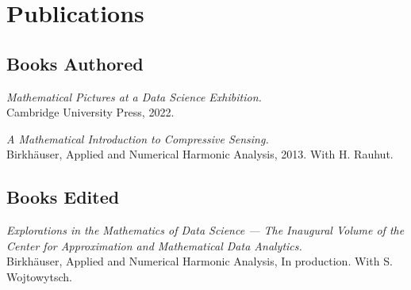 \documentclass[11pt]{article}
\begin{document}
%


\section{Publications}

\subsection{Books Authored}
\betaremune
\item{\sl Mathematical Pictures at a Data Science Exhibition.}\\
Cambridge University Press, 2022. 
\item {\sl A Mathematical Introduction to Compressive Sensing.}\\
Birkh\"auser, Applied and Numerical Harmonic Analysis, 2013.  With H. Rauhut.
\eetaremune

\subsection{Books Edited}
\betaremune
\item{\sl Explorations in the Mathematics of Data Science --- The Inaugural Volume of the Center for Approximation and Mathematical Data Analytics.}\\
Birkh\"auser, Applied and Numerical Harmonic Analysis, In production. With S. Wojtowytsch.
\eetaremune
\end{document}
